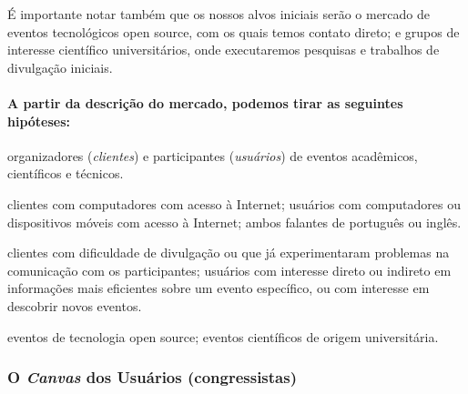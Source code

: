 \documentclass[12pt,a4paper,twoside,hyphens,english,brazil]{abntex2}
\newcommand{\hip}{{\color{BlueViolet}\framebox[1.1\width]{HIP}}}
\begin{document}

É importante notar também que os nossos alvos iniciais serão o mercado de eventos tecnológicos open source, com os quais temos contato direto; e grupos de interesse científico universitários, onde executaremos pesquisas e trabalhos de divulgação iniciais.

\paragraph*{A partir da descrição do mercado, podemos tirar as seguintes hipóteses:}
\begin{description}[itemsep=-1ex]
	\item[Mercado] organizadores (\textit{clientes}) e participantes (\textit{usuários}) de eventos acadêmicos, científicos e técnicos.
	\item[Mercado disponível] clientes com computadores com acesso à Internet; usuários com computadores ou dispositivos móveis com acesso à Internet; ambos falantes de português ou inglês.
	\item[Mercado-alvo] clientes com dificuldade de divulgação ou que já experimentaram problemas na comunicação com os participantes; usuários com interesse direto ou indireto em informações mais eficientes sobre um evento específico, ou com interesse em descobrir novos eventos.
	\item[Mercado-alvo primário] eventos de tecnologia open source; eventos científicos de origem universitária.
\end{description}


\iffalse %
\subsubsection*{O \emph{Canvas} dos Usuários (congressistas)}
\end{document}
